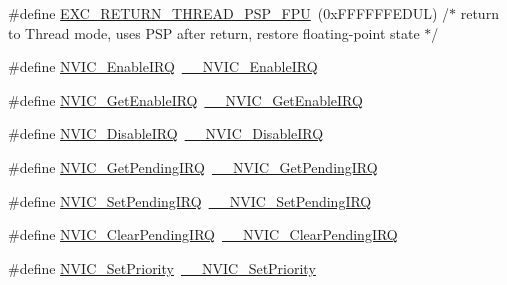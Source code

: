 \begin{DoxyCompactItemize}
\#define \hyperlink{group___c_m_s_i_s___core___n_v_i_c_functions_gadd2299e1d3a79c90b610c6b6f4cadb95}{E\+X\+C\+\_\+\+R\+E\+T\+U\+R\+N\+\_\+\+T\+H\+R\+E\+A\+D\+\_\+\+P\+S\+P\+\_\+\+F\+PU}~(0x\+F\+F\+F\+F\+F\+F\+E\+D\+U\+L)     /$\ast$ return to Thread mode, uses P\+S\+P after return, restore floating-\/point state  $\ast$/
\item 
\#define \hyperlink{group___c_m_s_i_s___core___n_v_i_c_functions_ga57b3064413dbc7459d9646020fdd8bef}{N\+V\+I\+C\+\_\+\+Enable\+I\+RQ}~\hyperlink{group___c_m_s_i_s___core___n_v_i_c_functions_ga71227e1376cde11eda03fcb62f1b33ea}{\+\_\+\+\_\+\+N\+V\+I\+C\+\_\+\+Enable\+I\+RQ}
\item 
\#define \hyperlink{group___c_m_s_i_s___core___n_v_i_c_functions_ga857de13232ec65dd15087eaa15bc4a69}{N\+V\+I\+C\+\_\+\+Get\+Enable\+I\+RQ}~\hyperlink{group___c_m_s_i_s___core___n_v_i_c_functions_gaaeb5e7cc0eaad4e2817272e7bf742083}{\+\_\+\+\_\+\+N\+V\+I\+C\+\_\+\+Get\+Enable\+I\+RQ}
\item 
\#define \hyperlink{group___c_m_s_i_s___core___n_v_i_c_functions_ga73b4e251f59cab4e9a5e234aac02ae57}{N\+V\+I\+C\+\_\+\+Disable\+I\+RQ}~\hyperlink{group___c_m_s_i_s___core___n_v_i_c_functions_gae016e4c1986312044ee768806537d52f}{\+\_\+\+\_\+\+N\+V\+I\+C\+\_\+\+Disable\+I\+RQ}
\item 
\#define \hyperlink{group___c_m_s_i_s___core___n_v_i_c_functions_gac608957a239466e9e0cbc30aa64feb3b}{N\+V\+I\+C\+\_\+\+Get\+Pending\+I\+RQ}~\hyperlink{group___c_m_s_i_s___core___n_v_i_c_functions_ga5a92ca5fa801ad7adb92be7257ab9694}{\+\_\+\+\_\+\+N\+V\+I\+C\+\_\+\+Get\+Pending\+I\+RQ}
\item 
\#define \hyperlink{group___c_m_s_i_s___core___n_v_i_c_functions_ga2b47e2e52cf5c48a5c3348636434b3ac}{N\+V\+I\+C\+\_\+\+Set\+Pending\+I\+RQ}~\hyperlink{group___c_m_s_i_s___core___n_v_i_c_functions_gaabefdd4b790b9a7308929938c0c1e1ad}{\+\_\+\+\_\+\+N\+V\+I\+C\+\_\+\+Set\+Pending\+I\+RQ}
\item 
\#define \hyperlink{group___c_m_s_i_s___core___n_v_i_c_functions_ga590cf113000a079b1f0ea3dcd5b5316c}{N\+V\+I\+C\+\_\+\+Clear\+Pending\+I\+RQ}~\hyperlink{group___c_m_s_i_s___core___n_v_i_c_functions_ga562a86dbdf14827d0fee8fdafb04d191}{\+\_\+\+\_\+\+N\+V\+I\+C\+\_\+\+Clear\+Pending\+I\+RQ}
\item 
\#define \hyperlink{group___c_m_s_i_s___core___n_v_i_c_functions_gae0e9d0e2f7b6133828c71b57d4941c35}{N\+V\+I\+C\+\_\+\+Set\+Priority}~\hyperlink{group___c_m_s_i_s___core___n_v_i_c_functions_ga505338e23563a9c074910fb14e7d45fd}{\+\_\+\+\_\+\+N\+V\+I\+C\+\_\+\+Set\+Priority}

\end{DoxyCompactItemize}
